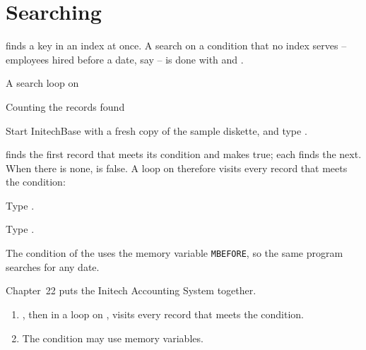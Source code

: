 \chapter{Searching}
 finds a key in an index at once.  A search on a condition that no
index serves -- employees hired before a date, say -- is done with
 and .

\begin{ChapterCovers}
\item A search loop on 
\item Counting the records found
\end{ChapterCovers}

Start InitechBase with a fresh copy of the sample diskette, and type
.

 finds the first record that meets its condition and makes
 true; each  finds the next.  When there is none,
 is false.  A loop on  therefore visits every record that
meets the condition:
\begin{Steps}
\item Type .
\item Type .
\end{Steps}
The condition of the  uses the memory variable \texttt{MBEFORE}, so the
same program searches for any date.

Chapter~22 puts the Initech Accounting System together.

\begin{enumerate}
\item {} , then  in a loop on
  , visits every record that meets the condition.
\item The condition may use memory variables.
\end{enumerate}
